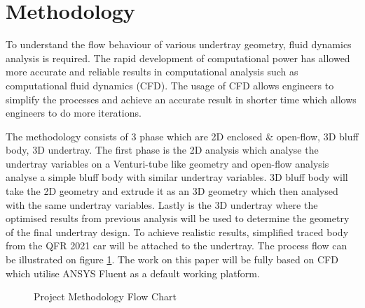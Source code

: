 \section{Methodology}
To understand the flow behaviour of various undertray geometry, fluid dynamics analysis is required. The rapid development of computational power has allowed more accurate and reliable results in computational analysis such as computational fluid dynamics (CFD)\cite{Andersson2011ComputationalEngineers}. The usage of CFD allows engineers to simplify the processes and achieve an accurate result in shorter time which allows engineers to do more iterations. 

\noindent The methodology consists of 3 phase which are 2D enclosed \& open-flow, 3D bluff body, 3D undertray. The first phase is the 2D analysis which analyse the undertray variables on a Venturi-tube like geometry and open-flow analysis analyse a simple bluff body with similar undertray variables. 3D bluff body will take the 2D geometry and extrude it as an 3D geometry which then analysed with the same undertray variables. Lastly is the 3D undertray where the optimised results from previous analysis will be used to determine the geometry of the final undertray design. To achieve realistic results, simplified traced body from the QFR 2021 car will be attached to the undertray. The process flow can be illustrated on figure \ref{fig:project methodology}. The work on this paper will be fully based on CFD which utilise ANSYS Fluent as a default working platform.

\begin{figure}[ht!]
    \centering
    \caption{Project Methodology Flow Chart}
    \label{fig:project methodology}
\end{figure}

